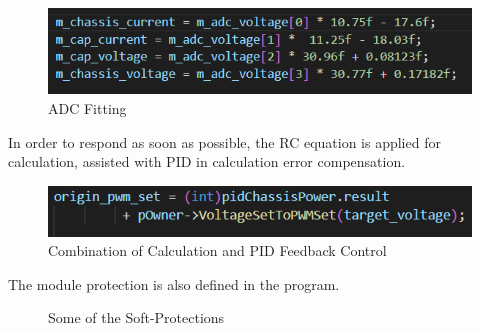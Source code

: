 \documentclass[a4paper,num-refs]{oup-contemporary}
\begin{document}
\begin{figure}[h]
	\centering
	\includegraphics[width=0.8\linewidth]{Multimeter.png}
	\caption{ADC Fitting}
\end{figure} 

In order to respond as soon as possible, the RC equation is applied for calculation, assisted with PID in calculation error compensation.
\begin{figure}[h]
	\centering
	\includegraphics[width=0.8\linewidth]{PIDandCal.png}
	\caption{Combination of Calculation and PID Feedback Control}
\end{figure} 


The module protection is also defined in the program.
\begin{figure}[h!]
	\centering
	\begin{minipage}[t]{0.8\linewidth}
		\centering
	\end{minipage}
\vfill
	\begin{minipage}[t]{0.8\linewidth}
		\centering
	\end{minipage}
\caption{Some of the Soft-Protections}
\end{figure} 

\end{document}
